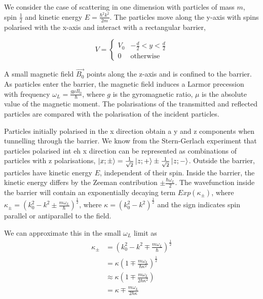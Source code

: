 \documentclass{article}
\begin{document}
We consider the case of scattering in one dimension with particles of mass $m$, spin $\frac{1}{2}$ and kinetic energy $
E = \frac{\hbar^2k^2}{2m}$. The particles move along the y-axis with spins polarised with the x-axis and interact with a rectangular barrier,

\begin{equation}
	V = 
	\begin{cases}
	V_0 & -\frac{d}{2}<y<\frac{d}{2}\\
		0 & \text{otherwise}
	\end{cases}
\end{equation}

A small magnetic field $\vec{B_{0}}$ points along the z-axis and is confined to the barrier. As particles enter the barrier, the magnetic field induces a Larmor precession with frequency $\omega_{L}=\frac{g \mu B_{0}}{\hbar}$, where $g$ is the gyromagnetic ratio, $\mu$ is the absolute value of the magnetic moment. The polarisations of the transmitted and reflected particles are compared with the polarisation of the incident particles.

Particles initially polarised in the x direction obtain a y and z components when tunnelling through the barrier. We know from the Stern-Gerlach experiment that particles polarised int eh x direction can be represented as combinations of particles with z polarisations, $\ket{x; \pm} = \frac{1}{\sqrt{2}}\ket{z;+} \pm \frac{1}{\sqrt{2}}\ket{z;-}$. Outside the barrier, particles have kinetic energy $E$, independent of their spin. Inside the barrier, the kinetic energy differs by the Zeeman contribution $\pm \frac{\hbar \omega_{L}}{2}$. The wavefunction inside the barrier will contain an exponentially decaying term $Exp(\kappa_{\pm})$, where $\kappa_{\pm} = (k^{2}_{0}-k^{2} \pm \frac{m \omega_L}{\hbar})^{\frac{1}{2}}$, where $\kappa = (k_{0}^2-k^2)^{\frac{1}{2}}$ and the sign indicates spin parallel or antiparallel to the field.  

We can approximate this in the small $\omega_L$ limit as
	\begin{align*}
		\kappa_{\pm} &= \left(k^{2}_{0}-k^{2} \mp \frac{m \omega_{L}}{\hbar}\right)^{\frac{1}{2}}\\	
			     &= \kappa \left(1 \mp \frac{m \omega_{L}}{\hbar \kappa^{2}}\right)^{\frac{1}{2}}\\
			     &\approx \kappa \left(1 \mp \frac{m \omega_{L}}{2\hbar \kappa^{2}}\right)\\
			      &= \kappa \mp \frac{m \omega_{L}}{2\hbar \kappa}
	\end{align*}
\end{document}
